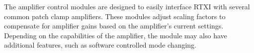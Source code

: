 The amplifier control modules are designed to easily interface RTXI with several common patch clamp amplifiers. These modules adjust scaling factors to compensate for amplifier gains based on the amplifier's current settings. Depending on the capabilities of the amplifier, the module may also have additional features, such as software controlled mode changing.